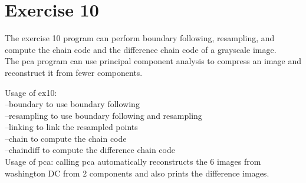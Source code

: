 \documentclass[10pt]{article}
\begin{document}
\section{Exercise 10}
The exercise 10 program can perform boundary following, resampling, and compute the chain code and the difference chain code of a grayscale image.\\

The pca program can use principal component analysis to compress an image and reconstruct it from fewer components.

Usage of ex10: \\
--boundary to use boundary following\\
--resampling to use boundary following and resampling\\
--linking to link the resampled points\\
--chain to compute the chain code\\
--chaindiff to compute the difference chain code\\

Usage of pca:
calling pca automatically reconstructs the 6 images from washington DC from 2 components and also prints the difference images.
\end{document}
